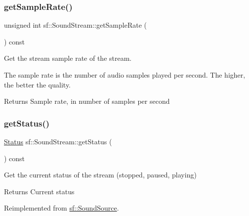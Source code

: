 \subsubsection{\texorpdfstring{getSampleRate()}{getSampleRate()}}
{\footnotesize\ttfamily unsigned int sf\+::\+Sound\+Stream\+::get\+Sample\+Rate (\begin{DoxyParamCaption}{ }\end{DoxyParamCaption}) const}



Get the stream sample rate of the stream. 

The sample rate is the number of audio samples played per second. The higher, the better the quality.

\begin{DoxyReturn}{Returns}
Sample rate, in number of samples per second \begin{DoxyVerb}\end{DoxyVerb}
 
\end{DoxyReturn}
\mbox{\label{classsf_1_1_sound_stream_a64a8193ed728da37c115c65de015849f}} 
\subsubsection{\texorpdfstring{getStatus()}{getStatus()}}
{\footnotesize\ttfamily \mbox{\hyperlink{classsf_1_1_sound_source_ac43af72c98c077500b239bc75b812f03}{Status}} sf\+::\+Sound\+Stream\+::get\+Status (\begin{DoxyParamCaption}{ }\end{DoxyParamCaption}) const\hspace{0.3cm}{\ttfamily [virtual]}}



Get the current status of the stream (stopped, paused, playing) 

\begin{DoxyReturn}{Returns}
Current status \begin{DoxyVerb}\end{DoxyVerb}
 
\end{DoxyReturn}


Reimplemented from \mbox{\hyperlink{classsf_1_1_sound_source_aa8d313c31b968159582a999aa66e5ed7}{sf\+::\+Sound\+Source}}.

